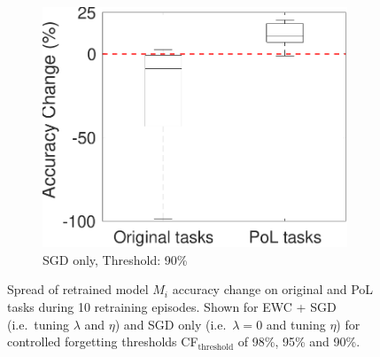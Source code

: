 \begin{figure}[!t]
\begin{subfigure}{.3\textwidth}
        \includegraphics[width=1\textwidth]{other/figures/90-124-4_v1.pdf}
        \caption{SGD only, Threshold: 90\%}
        \label{90_box_SGD}
    \end{subfigure}
    \caption{Spread of retrained model $M_i$ accuracy change on original and PoL tasks during 10 retraining episodes. Shown for EWC + SGD (i.e.\ tuning $\lambda$ and $\eta$) and SGD only (i.e.\ $\lambda = 0$ and tuning $\eta$) for controlled forgetting thresholds CF$_{\text{threshold}}$ of 98\%, 95\% and 90\%. }
    \label{fig:box}
\end{figure}

